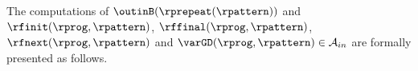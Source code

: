 The computations of $\outinB(\rprepeat({\rpattern}))$ and $\rfinit(\rprog, \rpattern)$,
$\rffinal(\rprog, \rpattern)$, $\rfnext(\rprog, \rpattern)$ and $\varGD(\rprog, \rpattern) \in \mathcal{A}_{in}$
are formally presented as follows.
